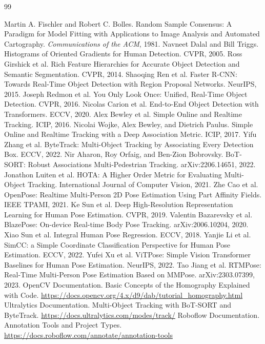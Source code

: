 \documentclass[11pt,a4paper,oneside]{report}
\renewcommand{\bibname}{References}
\begin{document}
\renewcommand{\bibname}{References and Further Reading}
\small
\begin{thebibliography}{99}
 Martin A. Fischler and Robert C. Bolles. Random Sample Consensus: A Paradigm for Model Fitting with Applications to Image Analysis and Automated Cartography. \textit{Communications of the ACM}, 1981.
 Navneet Dalal and Bill Triggs. Histograms of Oriented Gradients for Human Detection. CVPR, 2005.
 Ross Girshick et al. Rich Feature Hierarchies for Accurate Object Detection and Semantic Segmentation. CVPR, 2014.
 Shaoqing Ren et al. Faster R-CNN: Towards Real-Time Object Detection with Region Proposal Networks. NeurIPS, 2015.
 Joseph Redmon et al. You Only Look Once: Unified, Real-Time Object Detection. CVPR, 2016.
 Nicolas Carion et al. End-to-End Object Detection with Transformers. ECCV, 2020.
 Alex Bewley et al. Simple Online and Realtime Tracking. ICIP, 2016.
 Nicolai Wojke, Alex Bewley, and Dietrich Paulus. Simple Online and Realtime Tracking with a Deep Association Metric. ICIP, 2017.
 Yifu Zhang et al. ByteTrack: Multi-Object Tracking by Associating Every Detection Box. ECCV, 2022.
 Nir Aharon, Roy Orfaig, and Ben-Zion Bobrovsky. BoT-SORT: Robust Associations Multi-Pedestrian Tracking. arXiv:2206.14651, 2022.
 Jonathon Luiten et al. HOTA: A Higher Order Metric for Evaluating Multi-Object Tracking. International Journal of Computer Vision, 2021.
 Zhe Cao et al. OpenPose: Realtime Multi-Person 2D Pose Estimation Using Part Affinity Fields. IEEE TPAMI, 2021.
 Ke Sun et al. Deep High-Resolution Representation Learning for Human Pose Estimation. CVPR, 2019.
 Valentin Bazarevsky et al. BlazePose: On-device Real-time Body Pose Tracking. arXiv:2006.10204, 2020.
 Xiao Sun et al. Integral Human Pose Regression. ECCV, 2018.
 Yanjie Li et al. SimCC: a Simple Coordinate Classification Perspective for Human Pose Estimation. ECCV, 2022.
 Yufei Xu et al. ViTPose: Simple Vision Transformer Baselines for Human Pose Estimation. NeurIPS, 2022.
 Tao Jiang et al. RTMPose: Real-Time Multi-Person Pose Estimation Based on MMPose. arXiv:2303.07399, 2023.
 OpenCV Documentation. Basic Concepts of the Homography Explained with Code. \url{https://docs.opencv.org/4.x/d9/dab/tutorial_homography.html}
 Ultralytics Documentation. Multi-Object Tracking with BoT-SORT and ByteTrack. \url{https://docs.ultralytics.com/modes/track/}
 Roboflow Documentation. Annotation Tools and Project Types. \url{https://docs.roboflow.com/annotate/annotation-tools}
\end{thebibliography}
\normalsize
\end{document}
